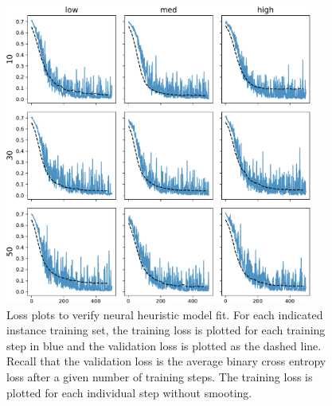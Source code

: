 \documentclass[a4paper]{article}
\theoremstyle{definition}
\theoremstyle{plain}
\begin{document}
\begin{figure}
  \centering
  \includegraphics[width=0.9\textwidth]{figures/single/neural_fit.pdf}
  \caption{Loss plots to verify neural heuristic model fit. For each indicated
    instance training set, the training loss is plotted for each training step
    in blue and the validation loss is plotted as the dashed line. Recall that
    the validation loss is the average binary cross entropy loss after a given
    number of training steps. The training loss is plotted for each individual
    step without smooting.}
  \label{fig:neural_fit}
\end{figure}
\end{document}
